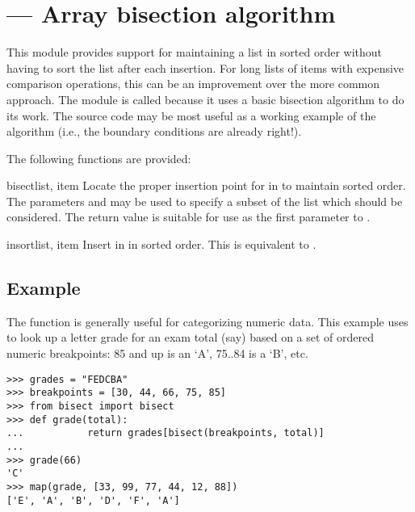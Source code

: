 \section{ ---
         Array bisection algorithm}



This module provides support for maintaining a list in sorted order
without having to sort the list after each insertion.  For long lists
of items with expensive comparison operations, this can be an
improvement over the more common approach.  The module is called
 because it uses a basic bisection algorithm to do its
work.  The source code may be most useful as a working example of the
algorithm (i.e., the boundary conditions are already right!).

The following functions are provided:

\begin{funcdesc}{bisect}{list, item}
Locate the proper insertion point for  in  to
maintain sorted order.  The parameters  and  may be
used to specify a subset of the list which should be considered.  The
return value is suitable for use as the first parameter to
.
\end{funcdesc}

\begin{funcdesc}{insort}{list, item}
Insert  in  in sorted order.  This is equivalent
to .
\end{funcdesc}


\subsection{Example}

The  function is generally useful for categorizing
numeric data.  This example uses  to look up a
letter grade for an exam total (say) based on a set of ordered numeric
breakpoints: 85 and up is an `A', 75..84 is a `B', etc.

\begin{verbatim}
>>> grades = "FEDCBA"
>>> breakpoints = [30, 44, 66, 75, 85]
>>> from bisect import bisect
>>> def grade(total):
...           return grades[bisect(breakpoints, total)]
...
>>> grade(66)
'C'
>>> map(grade, [33, 99, 77, 44, 12, 88])
['E', 'A', 'B', 'D', 'F', 'A']
\end{verbatim}
